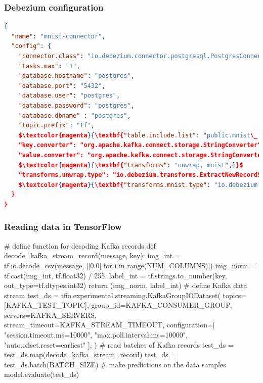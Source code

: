 \documentclass[10pt,utf8]{beamer}
\begin{document}
\begin{frame}[fragile]
    \frametitle{Debezium configuration}
    \footnotesize
    \begin{lstlisting}[language=json, mathescape=true]
{
  "name": "mnist-connector",
  "config": {
    "connector.class": "io.debezium.connector.postgresql.PostgresConnector",
    "tasks.max": "1",
    "database.hostname": "postgres",
    "database.port": "5432",
    "database.user": "postgres",
    "database.password": "postgres",
    "database.dbname" : "postgres",
    "topic.prefix": "tf",
    $\textcolor{magenta}{\textbf{"table.include.list": "public.mnist\_.*",}}$
    "key.converter": "org.apache.kafka.connect.storage.StringConverter",
    "value.converter": "org.apache.kafka.connect.storage.StringConverter",
    $\textcolor{magenta}{\textbf{"transforms": "unwrap, mnist",}}$
    "transforms.unwrap.type": "io.debezium.transforms.ExtractNewRecordState",
    $\textcolor{magenta}{\textbf{"transforms.mnist.type": "io.debezium.transforms.MnistToCsv"}}$
  }
} 
     \end{lstlisting}
\end{frame}

\begin{frame}[fragile]
    \frametitle{Reading data in TensorFlow}
    \vspace{-0.2cm}
    \footnotesize
    \begin{python}
# define function for decoding Kafka records
def decode_kafka_stream_record(message, key):
    img_int = tf.io.decode_csv(message, [[0.0] for i in range(NUM_COLUMNS)])
    img_norm = tf.cast(img_int, tf.float32) / 255.
    label_int = tf.strings.to_number(key, out_type=tf.dtypes.int32)
    return (img_norm, label_int)
# define Kafka data stream
test_ds = tfio.experimental.streaming.KafkaGroupIODataset(
    topics=[KAFKA_TEST_TOPIC],
    group_id=KAFKA_CONSUMER_GROUP,
    servers=KAFKA_SERVERS,
    stream_timeout=KAFKA_STREAM_TIMEOUT,
    configuration=[
        "session.timeout.ms=10000",
        "max.poll.interval.ms=10000",
        "auto.offset.reset=earliest"
    ],
)
# read batches of Kafka records
test_ds = test_ds.map(decode_kafka_stream_record)
test_ds = test_ds.batch(BATCH_SIZE)
# make predictions on the data samples
model.evaluate(test_ds)
    \end{python}
\end{frame}
\end{document}
